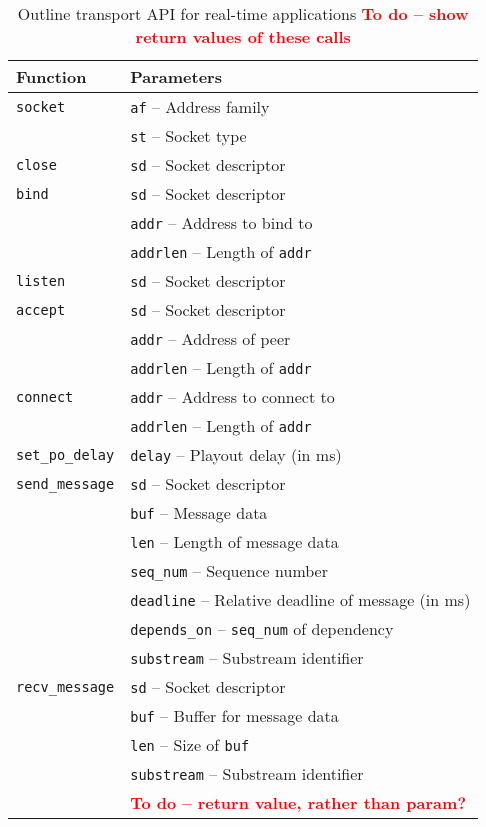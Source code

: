 \documentclass{sig-alternate-05-2015}
\newcommand{\todo}[1]{\textbf{\textcolor{red}{To do -- #1}}}
\begin{document}
\begin{table}
  \centering
  \begin{tabular}{ll}
    \toprule
      Function & Parameters \\
    \midrule
      \texttt{socket} & \texttt{af} -- Address family \\
                      & \texttt{st} -- Socket type \\
      \texttt{close} & \texttt{sd} -- Socket descriptor \\
    \midrule
      \texttt{bind} & \texttt{sd} -- Socket descriptor \\
                    & \texttt{addr} -- Address to bind to \\
                    & \texttt{addrlen} -- Length of \texttt{addr} \\
      \texttt{listen} & \texttt{sd} -- Socket descriptor \\
            \texttt{accept} & \texttt{sd} -- Socket descriptor \\
                    & \texttt{addr} -- Address of peer \\
                    & \texttt{addrlen} -- Length of \texttt{addr} \\
      \texttt{connect} & \texttt{addr} -- Address to connect to \\
                    & \texttt{addrlen} -- Length of \texttt{addr} \\
    \midrule
      \texttt{set\_po\_delay} & \texttt{delay} -- Playout delay (in ms) \\
    \midrule
      \texttt{send\_message} & \texttt{sd} -- Socket descriptor \\
      & \texttt{buf} -- Message data \\
      & \texttt{len} -- Length of message data \\
      & \texttt{seq\_num} -- Sequence number \\
      & \texttt{deadline} -- Relative deadline of message (in ms) \\ 
      & \texttt{depends\_on} -- \texttt{seq\_num} of dependency \\
      & \texttt{substream} -- Substream identifier \\
      \texttt{recv\_message} & \texttt{sd} -- Socket descriptor \\
      & \texttt{buf} -- Buffer for message data \\
      & \texttt{len} -- Size of \texttt{buf} \\
      & \texttt{substream} -- Substream identifier \\
      & \todo{return value, rather than param?}\\
    \bottomrule
  \end{tabular}
  \caption{Outline transport API for real-time applications 
          \todo{show return values of these calls}}
  \label{tab:api}
\end{table}
\end{document}
